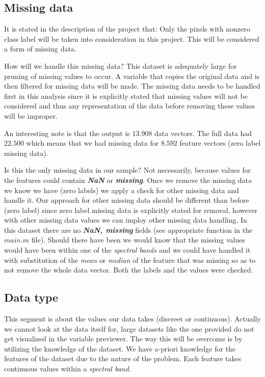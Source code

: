 \documentclass[12pt, a4paper]{article}
\begin{document}
\subsection{Missing data}

It is stated in the description of the project that: Only the pixels with nonzero class label will be taken into consideration in this project. This will be considered a form of missing data.
\newline

How will we handle this missing data? This dataset is adequately large for pruning of missing values to occur. A variable that copies the original data and is then filtered for missing data will be made. The missing data needs to be handled first in this analysis since it is explicitly stated that missing values will not be considered and thus any representation of the data before removing these values will be improper.
\newline

An interesting note is that the output is $13.908$ data vectors. The full data had $22.500$ which means that we had missing data for $8.592$ feature vectors (zero label missing data).
\newline

Is this the only missing data in our sample? Not necessarily, because values for the features could contain \textbf{\textit{NaN}} or \textbf{\textit{missing}}. Once we remove the missing data we know we have (zero labels) we apply a check for other missing data and handle it. Our approach for other missing data should be different than before (zero label) since zero label missing data is explicitly stated for removal, however with other missing data values we can imploy other missing data handling. In this dataset there are no \textbf{\textit{NaN, missing}} fields (see appropriate function in the $main.m$ file). Should there have been we would know that the missing values would have been within one of the \textit{spectral bands} and we could have handled it with substitution of the \textit{mean} or \textit{median} of the feature that was missing so as to not remove the whole data vector. Both the labels and the values were checked.

\subsection{Data type}

This segment is about the values our data takes (discreet or continuous). Actually we cannot look at the data itself for, large datasets like the one provided do not get visualized in the variable previewer. The way this will be overcome is by utilizing the knowledge of the dataset. We have a-priori knowledge for the features of the dataset due to the nature of the problem. Each feature takes continuous values within a \textit{spectral band}.
\newline
\end{document}
